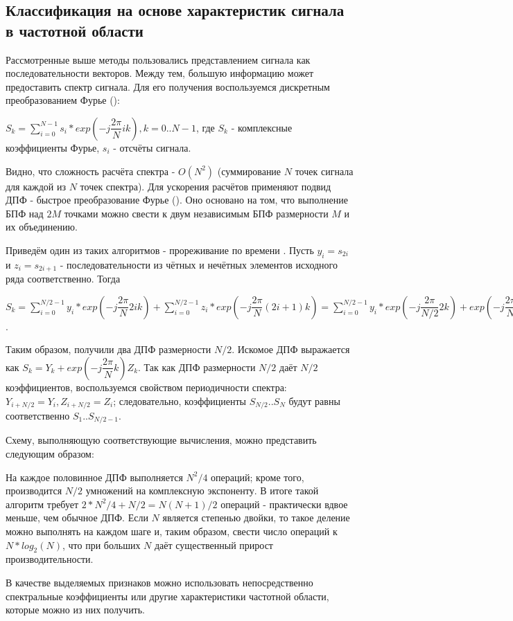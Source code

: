\subsection{Классификация на основе характеристик сигнала в частотной области}

Рассмотренные выше методы пользовались представлением сигнала как последовательности векторов. Между тем, большую информацию может предоставить спектр сигнала. Для его получения воспользуемся дискретным преобразованием Фурье ():

$S_k=\sum_{i=0}^{N-1}s_i*exp(-j\dfrac{2\pi}{N}ik), k=0..N-1$, где $S_k$ - комплексные коэффициенты Фурье, $s_i$ - отсчёты сигнала.


Видно, что сложность расчёта спектра - $O(N^2)$ (суммирование $N$ точек сигнала для каждой из $N$ точек спектра). Для ускорения расчётов применяют подвид ДПФ - быстрое преобразование Фурье (). Оно основано на том, что выполнение БПФ над $2M$ точками можно свести к двум независимым БПФ размерности $M$ и их объединению. 

Приведём один из таких алгоритмов - прореживание по времени \cite{fft_alg}. Пусть $y_i=s_{2i}$ и $z_i=s_{2i+1}$ - последовательности из чётных и нечётных элементов исходного ряда соответственно. Тогда

$S_k=\sum_{i=0}^{N/2-1}y_i*exp(-j\dfrac{2\pi}{N}2ik)+\sum_{i=0}^{N/2-1}z_i*exp(-j\dfrac{2\pi}{N}(2i+1)k)=\sum_{i=0}^{N/2-1}y_i*exp(-j\dfrac{2\pi}{N/2}2k)+exp(-j\dfrac{2\pi}{N}k)\sum_{i=0}^{N/2-1}z_i*exp(-j\dfrac{2\pi}{N/2}ik)$.

Таким образом, получили два ДПФ размерности $N/2$. Искомое ДПФ выражается как 
$S_k=Y_k+exp(-j\dfrac{2\pi}{N}k)Z_k$. Так как ДПФ размерности $N/2$ даёт $N/2$ коэффициентов, воспользуемся свойством периодичности спектра: $Y_{i+N/2}=Y_i, Z_{i+N/2}=Z_i$; следовательно, коэффициенты $S_{N/2}..S_{N}$ будут равны соответственно $S_{1}..S_{N/2-1}$. 

Схему, выполняющую соответствующие вычисления, можно представить следующим образом:


На каждое половинное ДПФ выполняется $N^2/4$ операций; кроме того, производится $N/2$ умножений на комплексную экспоненту. В итоге такой алгоритм требует $2*N^2/4+N/2=N(N+1)/2$ операций - практически вдвое меньше, чем обычное ДПФ. Если $N$ является степенью двойки, то такое деление можно выполнять на каждом шаге и, таким образом, свести число операций к $N*log_2(N)$, что при больших $N$ даёт существенный прирост производительности.

В качестве выделяемых признаков можно использовать непосредственно спектральные коэффициенты или другие характеристики частотной области, которые можно из них получить.

